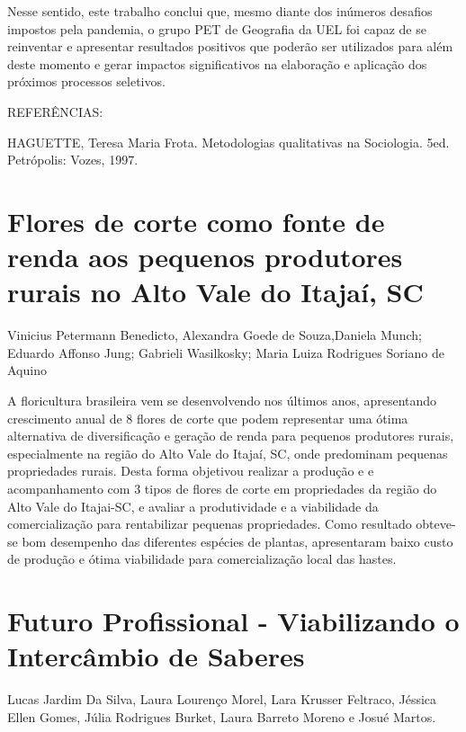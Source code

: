 Nesse sentido, este trabalho conclui que, mesmo diante dos inúmeros desafios impostos pela pandemia, o grupo PET de Geografia da UEL foi capaz de se reinventar e apresentar resultados positivos que poderão ser utilizados para além deste momento e gerar impactos significativos na elaboração e aplicação dos próximos processos seletivos.

REFERÊNCIAS:

HAGUETTE, Teresa Maria Frota. Metodologias qualitativas na Sociologia. 5ed. Petrópolis: Vozes, 1997.



\section{Flores de corte como fonte de renda aos pequenos produtores rurais no Alto Vale do Itajaí, SC}

Vinicius Petermann Benedicto, Alexandra Goede de Souza,Daniela Munch; Eduardo Affonso Jung;  Gabrieli Wasilkosky; Maria Luiza Rodrigues Soriano de Aquino

A floricultura brasileira vem se desenvolvendo nos últimos anos, apresentando crescimento anual de 8%
 flores de corte que podem representar uma ótima alternativa de diversificação e geração de renda para pequenos produtores rurais, especialmente na região do Alto Vale do Itajaí, SC, onde predominam pequenas propriedades rurais. Desta forma objetivou realizar a produção e e acompanhamento com 3 tipos de flores de corte em propriedades da região do Alto Vale do Itajai-SC, e avaliar a produtividade e a viabilidade da comercialização para rentabilizar pequenas propriedades. Como resultado obteve-se bom desempenho das diferentes espécies de plantas, apresentaram baixo custo de produção e ótima viabilidade para comercialização local das hastes.



\section{Futuro Profissional - Viabilizando o Intercâmbio de Saberes}

Lucas Jardim Da Silva, Laura Lourenço Morel, Lara Krusser Feltraco, Jéssica Ellen Gomes, Júlia Rodrigues Burket, Laura Barreto Moreno e Josué Martos.

